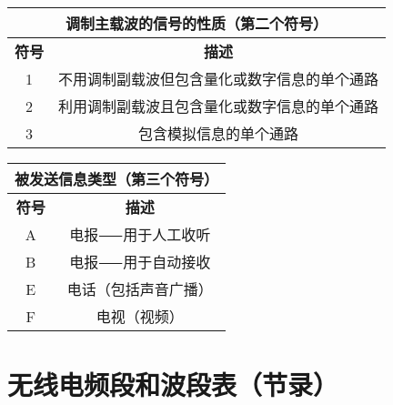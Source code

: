 \bigskip

\begin{tabular}{|c|c|}
  \hline
  \multicolumn{2}{|c|}{\textbf{调制主载波的信号的性质（第二个符号）}} \\
  \hline
  \textbf{符号} & \textbf{描述}                         \\
  \hline
  1           & 不用调制副载波但包含量化或数字信息的单个通路              \\
  \hline
  2           & 利用调制副载波且包含量化或数字信息的单个通路              \\
  \hline
  3           & 包含模拟信息的单个通路                         \\
  \hline
\end{tabular}

\bigskip

\begin{tabular}{|c|c|}
  \hline
  \multicolumn{2}{|c|}{\textbf{被发送信息类型（第三个符号）}} \\
  \hline
  \textbf{符号} & \textbf{描述}                     \\
  \hline
  A           & 电报⸺用于人工收听                      \\
  \hline
  B           & 电报⸺用于自动接收                      \\
  \hline
  E           & 电话（包括声音广播）                      \\
  \hline
  F           & 电视（视频）                          \\
  \hline
\end{tabular}

\newpage

\section{无线电频段和波段表（节录）}

